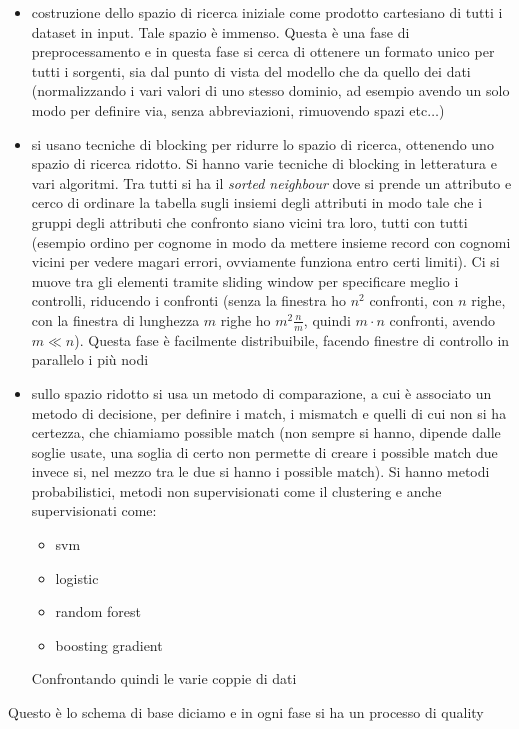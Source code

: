 \documentclass[a4paper,12pt, oneside]{book}
\begin{document}
\begin{itemize}
  \item costruzione dello spazio di ricerca iniziale come prodotto
  cartesiano di tutti i dataset in input. Tale spazio è immenso. Questa è una
  fase di preprocessamento e in questa fase si cerca di ottenere un formato
  unico per tutti i sorgenti, sia dal punto di vista del modello che da quello
  dei dati (normalizzando i vari valori di uno stesso dominio, ad esempio avendo
  un solo modo per definire via, senza abbreviazioni, rimuovendo spazi
  etc$\ldots$) 
  \item si usano tecniche di blocking per ridurre lo spazio di ricerca,
  ottenendo uno spazio di ricerca ridotto. Si hanno varie tecniche di blocking
  in letteratura e vari algoritmi. Tra tutti si ha il \textit{sorted neighbour}
  dove si prende un attributo e cerco di ordinare la tabella sugli insiemi degli
  attributi in modo tale che i gruppi degli attributi che confronto siano vicini
  tra loro, tutti con tutti (esempio ordino per cognome in modo da mettere
  insieme record con cognomi vicini per vedere magari errori, ovviamente
  funziona entro certi limiti). Ci si muove tra gli elementi tramite sliding
  window per specificare meglio i controlli, riducendo i confronti (senza la
  finestra ho $n^2$ confronti, con $n$ righe, con la finestra di lunghezza $m$
  righe ho $m^2\frac{n}{m}$, quindi $m\cdot n$ confronti, avendo $m\ll
  n$). Questa fase è facilmente distribuibile, facendo finestre di controllo in
  parallelo i più nodi
  \item sullo spazio ridotto si usa un metodo di comparazione, a cui è associato
  un metodo di decisione, per definire i match, i mismatch e quelli di cui non
  si ha certezza, che chiamiamo possible match (non sempre si hanno, dipende
  dalle soglie usate, una soglia di certo non permette di creare i possible
  match due invece si, nel mezzo tra le due si hanno i possible match). Si hanno
  metodi probabilistici, metodi non supervisionati come il clustering e anche
  supervisionati come: 
  \begin{itemize}
    \item svm
    \item logistic
    \item random forest
    \item boosting gradient
  \end{itemize}
  Confrontando quindi le varie coppie di dati
\end{itemize}
Questo è lo schema di base diciamo e in ogni fase si ha un processo di quality
\end{document}
